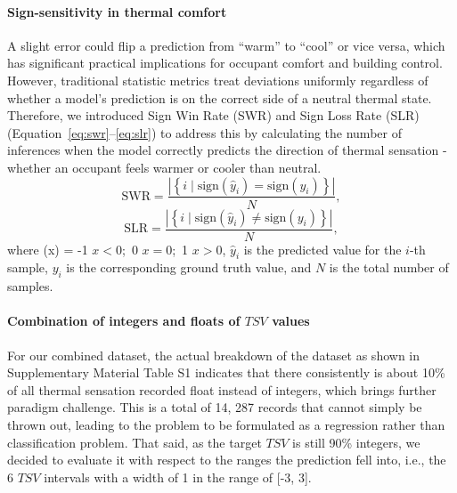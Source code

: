 \paragraph{Sign-sensitivity in thermal comfort} A slight error could flip a prediction from “warm” to “cool” or vice versa, which has significant practical implications for occupant comfort and building control. However, traditional statistic metrics treat deviations uniformly regardless of whether a model’s prediction is on the correct side of a neutral thermal state. Therefore, we introduced Sign Win Rate (SWR) and Sign Loss Rate (SLR) (Equation~\eqref{eq:swr}--\eqref{eq:slr}) to address this by calculating the number of inferences when the model correctly predicts the direction of thermal sensation - whether an occupant feels warmer or cooler than neutral. 
\begin{equation}
\text{SWR} = \frac{ \left| \left\{ i \mid \text{sign}(\hat{y}_i) = \text{sign}(y_i) \right\} \right| }{N},
\label{eq:swr}
\end{equation}
\begin{equation}
\text{SLR} = \frac{ \left| \left\{ i \mid \text{sign}(\hat{y}_i) \ne \text{sign}(y_i) \right\} \right| }{N},
\label{eq:slr}
\end{equation}
\noindent
where (x) = -1  $x < 0$;\ 0  $x = 0$;\ 1  $x > 0$,  \( \hat{y}_i \) is the predicted value for the \( i \)-th sample, \( y_i \) is the corresponding ground truth value, and \( N \) is the total number of samples.

\paragraph{Combination of integers and floats of $TSV$ values} For our combined dataset, the actual breakdown of the dataset as shown in Supplementary Material Table S1 indicates that there consistently is about 10\% of all thermal sensation recorded float instead of integers, which brings further paradigm challenge. This is a total of 14, 287 records that cannot simply be thrown out, leading to the problem to be formulated as a regression rather than classification problem. That said, as the target $TSV$ is still 90\% integers, we decided to evaluate it with respect to the ranges the prediction fell into, i.e., the 6 $TSV$ intervals with a width of 1 in the range of [-3, 3]. 

